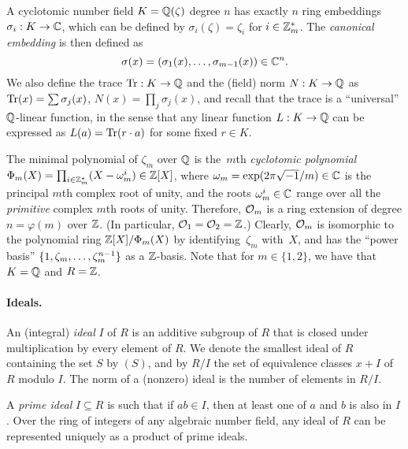 A cyclotomic number field
$K=\mathbb{Q}(\zeta)$ degree $n$ has exactly $n$ ring embeddings $\sigma_i: K
\to \mathbb{C}$, which can be defined by $\sigma_i(\zeta)=\zeta_i$ for $i \in
\mathbb{Z}_m^*$. The \emph{canonical embedding} is then defined as \[\sigma(x)
= (\sigma_1(x), \ldots, \sigma_{m-1}(x)) \in \mathbb{C}^{n}.\] We also define
the trace $\operatorname{Tr}: K \to \mathbb{Q}$ and the (field) norm $N: K \to \mathbb{Q}$ as
$\operatorname{Tr}(x)=\sum \sigma_j(x)$, $N(x)=\prod_{j}\sigma_j(x)$, and recall
that the trace is a ``universal'' $\mathbb{Q}$-linear function, in the sense
that  any linear function $L: K \to \mathbb{Q}$ can be expressed as
$L(a)=\operatorname{Tr}(r\cdot a)$ for some fixed $r \in K$. 

The minimal polynomial of $\zeta_{m}$
over $\mathbb{Q}$ is the~$m$th \emph{cyclotomic polynomial}
$\Phi_{m}(X)=\prod_{i \in \mathbb{Z}_{m}^{*}} (X-\omega_{m}^{i}) \in \mathbb{Z}[X]$,
where $\omega_{m}=\exp(2\pi\sqrt{-1}/m) \in \mathbb{C}$ is the principal $m$th
complex root of unity, and the roots $\omega_{m}^{i} \in \mathbb{C}$ range
over all the \emph{primitive} complex $m$th roots of unity.
Therefore, $\mathcal{O}_{m}$ is a ring extension of degree $n=\varphi(m)$ over
$\mathbb{Z}$.  (In particular, $\mathcal{O}_{1}=\mathcal{O}_{2}=\mathbb{Z}$.)  Clearly, $\mathcal{O}_{m}$ is
isomorphic to the polynomial ring $\mathbb{Z}[X]/\Phi_{m}(X)$ by
identifying~$\zeta_{m}$ with~$X$, and has the ``power basis''
$\{1,\zeta_{m}, \ldots, \zeta_{m}^{n-1}\}$ as a $\mathbb{Z}$-basis. Note
that for $m\in \{1,2\}$, we have that $K=\mathbb{Q}$ and $R=\mathbb{Z}$.


\paragraph{Ideals.}\label{par:ideals} An (integral) \emph{ideal} $I$ of $R$ is an
additive subgroup of $R$ that is closed under multiplication by every
element of $R$. We denote the smallest ideal of $R$ containing the set
$S$ by $(S)$, and by $R/I$ the set of equivalence classes $x+I$ of $R$
modulo $I$. The norm of a (nonzero) ideal is the number of elements in
$R/I$.

A \emph{prime ideal} $I \subseteq R$ is such that if $ab \in I$,
then at least one of $a$ and $b$ is also in $I$. Over the ring of
integers of any algebraic number field, any ideal of $R$ can be
represented uniquely as a product of prime ideals.

